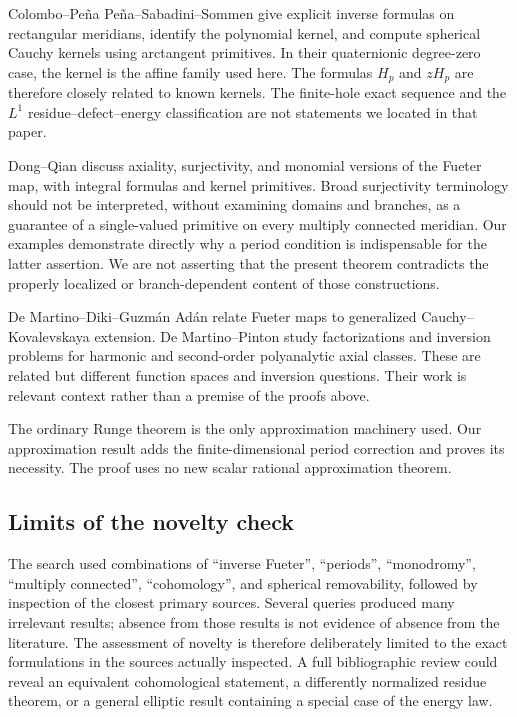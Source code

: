 \documentclass[11pt,a4paper]{article}
\numberwithin{equation}{section}
\theoremstyle{definition}
\theoremstyle{remark}
\begin{document}
Colombo--Pe\~na Pe\~na--Sabadini--Sommen \cite{CPSS} give explicit inverse
formulas on rectangular meridians, identify the polynomial kernel, and
compute spherical Cauchy kernels using arctangent primitives. In their
quaternionic degree-zero case, the kernel is the affine family used here.
The formulas $H_p$ and $zH_p$ are therefore closely related to known kernels.
The finite-hole exact sequence and the $L^1$ residue--defect--energy
classification are not statements we located in that paper.

Dong--Qian \cite{DQ} discuss axiality, surjectivity, and monomial versions of
the Fueter map, with integral formulas and kernel primitives. Broad
surjectivity terminology should not be interpreted, without examining domains
and branches, as a guarantee of a single-valued primitive on every
multiply connected meridian. Our examples demonstrate directly why a
period condition is indispensable for the latter assertion. We are not
asserting that the present theorem contradicts the properly localized or
branch-dependent content of those constructions.

De Martino--Diki--Guzm\'an Ad\'an \cite{DDG} relate Fueter maps to generalized
Cauchy--Kovalevskaya extension. De Martino--Pinton \cite{DP2026} study
factorizations and inversion problems for harmonic and second-order
polyanalytic axial classes. These are related but different function spaces
and inversion questions. Their work is relevant context rather than a premise
of the proofs above.

The ordinary Runge theorem \cite{Runge} is the only approximation machinery
used. Our approximation result adds the finite-dimensional period correction
and proves its necessity. The proof uses no new scalar rational
approximation theorem.

\subsection{Limits of the novelty check}
The search used combinations of ``inverse Fueter'', ``periods'',
``monodromy'', ``multiply connected'', ``cohomology'', and spherical
removability, followed by inspection of the closest primary sources.
Several queries produced many irrelevant results; absence from those results
is not evidence of absence from the literature. The assessment of novelty is
therefore deliberately limited to the exact formulations in the sources
actually inspected. A full bibliographic review could reveal an equivalent
cohomological statement, a differently normalized residue theorem, or a general
elliptic result containing a special case of the energy law.
\end{document}
